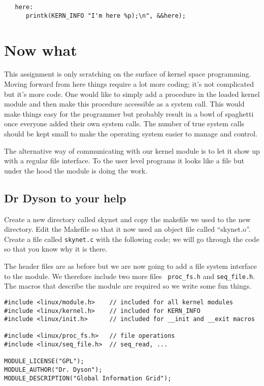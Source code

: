 \documentclass[a4paper,11pt]{article}
\begin{document}
\begin{lstlisting}
   here:
      printk(KERN_INFO "I'm here %p);\n", &&here);  
\end{lstlisting}

\section{Now what}

This assignment is only scratching on the surface of kernel space
programming. Moving forward from here things require a lot more
coding; it's not complicated but it's more code. One would like to
simply add a procedure in the loaded kernel module and then make this
procedure accessible as a system call. This would make things easy for
the programmer but probably result in a bowl of spaghetti once everyone
added their own system calls. The number of true system calls should
be kept small to make the operating system easier to manage and control.


The alternative way of communicating with our kernel module is to let
it show up with a regular file interface. To the user level programs
it looks like a file but under the hood the module is doing the
work. 

\subsection{Dr Dyson to your help}

Create a new directory called skynet and copy the makefile we used to
the new directory. Edit the Makefile so that it now used an object
file called ``skynet.o''. Create a file called {\tt skynet.c} with the
following code; we will go through the code so that you know why it is
there.

The header files are as before but we are now going to add a file system
interface to the module. We therefore include two more files {\tt
  proc\_fs.h} and {\tt seq\_file.h}. The macros that describe the module
are required so we write some fun things.

\begin{lstlisting}
#include <linux/module.h>    // included for all kernel modules
#include <linux/kernel.h>    // included for KERN_INFO
#include <linux/init.h>      // included for __init and __exit macros

#include <linux/proc_fs.h>   // file operations
#include <linux/seq_file.h>  // seq_read, ...

MODULE_LICENSE("GPL");
MODULE_AUTHOR("Dr. Dyson");
MODULE_DESCRIPTION("Global Information Grid");
\end{lstlisting}
\end{document}
